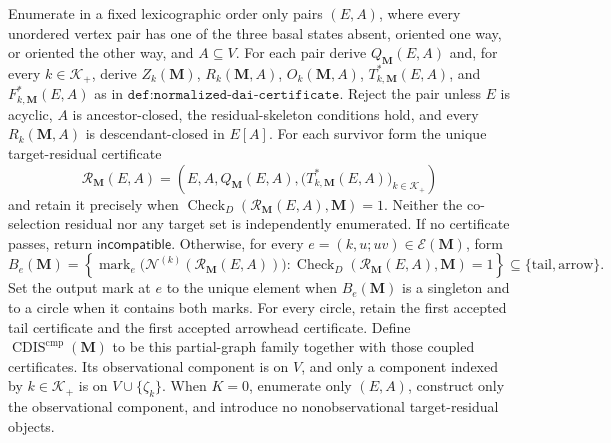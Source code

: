Enumerate in a fixed lexicographic order only pairs \((E,A)\), where every unordered vertex pair has one of the three basal states absent, oriented one way, or oriented the other way, and \(A\subseteq V\).  For each pair derive \(Q_{\mathbf M}(E,A)\) and, for every \(k\in\mathcal K_+\), derive \(Z_k(\mathbf M)\), \(R_k(\mathbf M,A)\), \(O_k(\mathbf M,A)\), \(T^*_{k,\mathbf M}(E,A)\), and \(F^*_{k,\mathbf M}(E,A)\) as in \(\texttt{def:normalized-dai-certificate}\).  Reject the pair unless \(E\) is acyclic, \(A\) is ancestor-closed, the residual-skeleton conditions hold, and every \(R_k(\mathbf M,A)\) is descendant-closed in \(E[A]\).  For each survivor form the unique target-residual certificate
\[
\mathcal R_{\mathbf M}(E,A)=
\left(E,A,Q_{\mathbf M}(E,A),
\bigl(T^*_{k,\mathbf M}(E,A)\bigr)_{k\in\mathcal K_+}\right)
\]
and retain it precisely when \(\operatorname{Check}_{D}(\mathcal R_{\mathbf M}(E,A),\mathbf M)=1\).  Neither the co-selection residual nor any target set is independently enumerated.  If no certificate passes, return \(\mathsf{incompatible}\).  Otherwise, for every \(e=(k,u;uv)\in\mathcal E(\mathbf M)\), form
\[
B_e(\mathbf M)=\left\{\operatorname{mark}_e\bigl(\mathcal N^{(k)}(\mathcal R_{\mathbf M}(E,A))\bigr):
\operatorname{Check}_{D}(\mathcal R_{\mathbf M}(E,A),\mathbf M)=1\right\}
\subseteq\{\mathrm{tail},\mathrm{arrow}\}.
\]
Set the output mark at \(e\) to the unique element when \(B_e(\mathbf M)\) is a singleton and to a circle when it contains both marks.  For every circle, retain the first accepted tail certificate and the first accepted arrowhead certificate.  Define \(\operatorname{CDIS}^{\mathrm{cmp}}(\mathbf M)\) to be this partial-graph family together with those coupled certificates.  Its observational component is on \(V\), and only a component indexed by \(k\in\mathcal K_+\) is on \(V\cup\{\zeta_k\}\).  When \(K=0\), enumerate only \((E,A)\), construct only the observational component, and introduce no nonobservational target-residual objects.